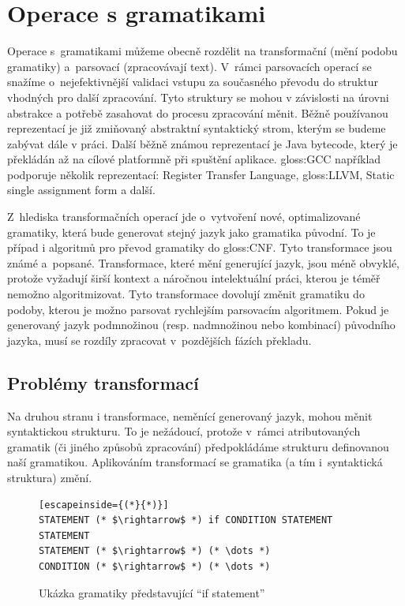 \chapter{Operace s gramatikami}
	
	Operace s~gramatikami můžeme obecně rozdělit na transformační (mění podobu gramatiky) a~parsovací (zpracovávají text). V~rámci parsovacích operací se snažíme o~nejefektivnější validaci vstupu za současného převodu do struktur vhodných pro další zpracování. Tyto struktury se mohou v závislosti na úrovni abstrakce a potřebě zasahovat do procesu zpracování měnit. Běžně používanou reprezentací je již zmiňovaný abstraktní syntaktický strom, kterým se budeme zabývat dále v práci. Další běžně známou reprezentací je Java bytecode, který je překládán až na cílové platformně při spuštění aplikace. \gls{gloss:GCC} například podporuje několik reprezentací: Register Transfer Language, \gls{gloss:LLVM}, Static single assignment form a další.
	
	Z~hlediska transformačních operací jde o~vytvoření nové, optimalizované gramatiky, která bude generovat stejný jazyk jako gramatika původní. To je případ i algoritmů pro převod gramatiky do \gls{gloss:CNF}. Tyto transformace jsou známé a~popsané. Transformace, které mění generující jazyk, jsou méně obvyklé, protože vyžadují širší kontext a náročnou intelektuální práci, kterou je téměř nemožno algoritmizovat. Tyto transformace dovolují změnit gramatiku do podoby, kterou je možno parsovat rychlejším parsovacím algoritmem. Pokud je generovaný jazyk podmnožinou (resp. nadmnožinou nebo kombinací) původního jazyka, musí se rozdíly zpracovat v~pozdějších fázích překladu.
	
	\section{Problémy transformací}
	
	Na druhou stranu i transformace, neměnící generovaný jazyk, mohou měnit syntaktickou strukturu. To je nežádoucí, protože v~rámci atributovaných gramatik (či jiného způsobů zpracování) předpokládáme strukturu definovanou naší gramatikou. Aplikováním transformací se gramatika (a tím i~syntaktická struktura) změní.
	
	\begin{figure}
	\begin{lstlisting}[escapeinside={(*}{*)}]
STATEMENT (* $\rightarrow$ *) if CONDITION STATEMENT STATEMENT
STATEMENT (* $\rightarrow$ *) (* \dots *)
CONDITION (* $\rightarrow$ *) (* \dots *)
	\end{lstlisting}
	\caption{Ukázka gramatiky představující \enquote{if statement}}
	\label{pic:ifStatementDemo}
	\end{figure}

